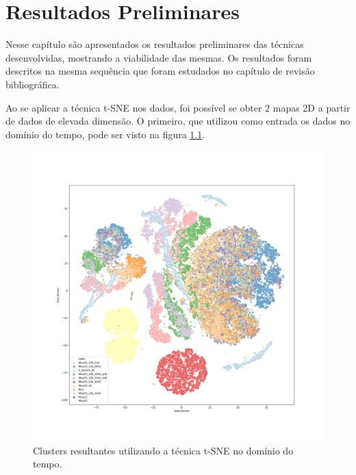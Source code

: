 
\chapter{Resultados Preliminares}

Nesse capítulo são apresentados os resultados preliminares das técnicas desenvolvidas, mostrando a viabilidade das mesmas. Os resultados 
foram descritos na mesma sequência que foram estudados no capítulo de revisão bibliográfica.

Ao se aplicar a técnica t-SNE nos dados, foi possível se obter 2 mapas 2D a partir de dados de elevada dimensão. O primeiro, que
utilizou como entrada os dados no domínio do tempo, pode ser visto na figura \ref{fig:t-sne-1}.

\begin{figure}[H]
    \caption{Clusters resultantes utilizando a técnica t-SNE no domínio do tempo.}
    \begin{center}
        \includegraphics[scale=.25]{resultados/img/t-sne-1.png}
    \end{center}
    \label{fig:t-sne-1}
\end{figure}

